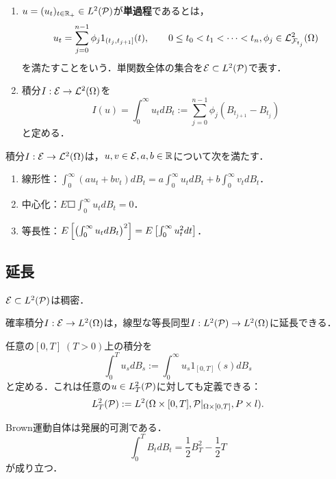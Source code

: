 \documentclass[uplatex,dvipdfmx]{jsreport}
\begin{document}
\begin{definition}\mbox{}
    \begin{enumerate}
        \item 
        $u=(u_t)_{t\in\R_+}\in L^2(\P)$が\textbf{単過程}であるとは，
        \[u_t=\sum_{j=0}^{n-1}\phi_j1_{(t_j,t_{j+1}]}(t),\qquad 0\le t_0<t_1<\cdots<t_n,\phi_j\in\L^2_{\F_{t_j}}(\Om)\]
        を満たすことをいう．単関数全体の集合を$\E\subset L^2(\P)$で表す．
        \item 積分$I:\E\to\L^2(\Om)$を
        \[I(u)=\int^\infty_0 u_tdB_t:=\sum^{n-1}_{j=0}\phi_j(B_{t_{j+1}}-B_{t_j})\]
        と定める．
    \end{enumerate}
\end{definition}

\begin{lemma}
    積分$I:\E\to\L^2(\Om)$は，$u,v\in\E,a,b\in\R$について次を満たす．
    \begin{enumerate}
        \item 線形性：$\int^\infty_0(au_t+bv_t)dB_t=a\int^\infty_0u_tdB_t+b\int^\infty_0v_tdB_t$．
        \item 中心化：$E\Square{\int^\infty_0u_tdB_t}=0$．
        \item 等長性：$E\Square{\paren{\int^\infty_0u_tdB_t}^2}=E\Square{\int^\infty_0u^2_tdt}$．
    \end{enumerate}
\end{lemma}

\subsection{延長}

\begin{proposition}
    $\E\subset L^2(\P)$は稠密．
\end{proposition}

\begin{proposition}
    確率積分$I:\E\to L^2(\Om)$は，線型な等長同型$I:L^2(\P)\to L^2(\Om)$に延長できる．
\end{proposition}

\begin{definition}
    任意の$[0,T]\;(T>0)$上の積分を
    \[\int^T_0u_sdB_s:=\int^\infty_0u_s1_{[0,T]}(s)dB_s\]
    と定める．これは任意の$u\in L^2_T(\P)$に対しても定義できる：
    \[L^2_T(\P):=L^2(\Om\times[0,T],\P|_{\Om\times[0,T]},P\times l).\]
\end{definition}

\begin{example}
    Brown運動自体は発展的可測である．
    \[\int^T_0B_tdB_t=\frac{1}{2}B^2_T-\frac{1}{2}T\]
    が成り立つ．
\end{example}
\end{document}
